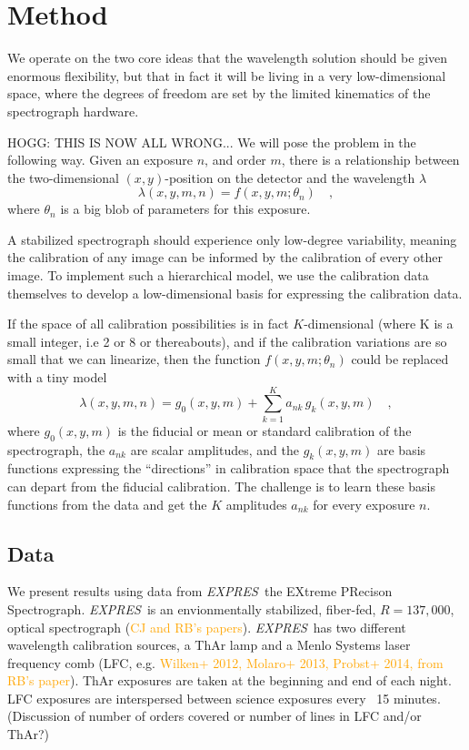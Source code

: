 \documentclass[12pt, letterpaper]{article}
\newcommand{\lz}[1]{\textcolor{orange}{#1}}
\newcommand{\project}[1]{\textsl{#1}}
\newcommand{\acronym}[1]{{\small{#1}}}
\newcommand{\expres}{\project{\acronym{EXPRES}}}
\begin{document}
\section{Method} \label{sec:method}
We operate on the two core ideas that the wavelength solution should be given enormous flexibility, but that in fact it will be living in a very low-dimensional space, where the degrees of freedom are set by the limited kinematics of the spectrograph hardware.

HOGG: THIS IS NOW ALL WRONG... We will pose the problem in the following way.  Given an exposure $n$, and order $m$, there is a relationship between
the two-dimensional $(x,y)$-position on the detector and the
wavelength $\lambda$
\begin{equation}
\lambda(x,y,m,n) = f(x,y,m;\theta_{n})
\quad ,
\end{equation}
where $\theta_{n}$ is a big blob of parameters for this exposure.

A stabilized spectrograph should experience only low-degree variability, meaning the calibration of any image can be informed by the calibration of every other image.  To implement such a hierarchical model, we use the calibration data themselves to develop a low-dimensional basis for expressing the calibration data.

If the space of all calibration possibilities is in fact $K$-dimensional (where K is a small integer, i.e 2 or 8 or thereabouts), and if the calibration variations are so
small that we can linearize, then the function $f(x,y,m;\theta_{n})$ could
be replaced with a tiny model
\begin{equation}
\lambda(x,y,m,n) = g_0(x,y,m) + \sum_{k=1}^K a_{nk}\,g_k(x,y,m)
\quad ,
\end{equation}
where
$g_0(x,y,m)$ is the fiducial or mean or standard calibration of the
spectrograph,
the $a_{nk}$ are scalar amplitudes,
and the $g_k(x,y,m)$ are basis functions expressing the ``directions'' in calibration space that the spectrograph can depart from the
fiducial calibration.
The challenge is to learn these basis functions from the data and get
the $K$ amplitudes $a_{nk}$ for every exposure $n$.

\subsection{Data} \label{sec:data}
We present results using data from \expres\, the EXtreme PRecison Spectrograph.  \expres\ is an envionmentally stabilized, fiber-fed, $R=137,000$, optical spectrograph (\lz{CJ and RB's papers}).  \expres\ has two different wavelength calibration sources, a ThAr lamp and a Menlo Systems laser frequency comb (LFC, e.g. \lz{Wilken+ 2012, Molaro+ 2013, Probst+ 2014, from RB's paper}).  ThAr exposures are taken at the beginning and end of each night.  LFC exposures are interspersed between science exposures every ~15 minutes.  
(Discussion of number of orders covered or number of lines in LFC and/or ThAr?)
\end{document}

